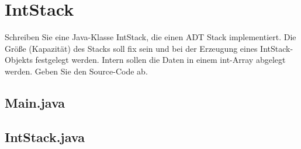 \section{IntStack}
Schreiben Sie eine Java-Klasse IntStack, die einen ADT Stack implementiert. Die Größe (Kapazität) des Stacks soll fix sein und bei der Erzeugung eines IntStack-Objekts festgelegt werden. Intern sollen die Daten in einem int-Array abgelegt werden. Geben Sie den Source-Code ab.

\subsection{Main.java}


\subsection{IntStack.java}
